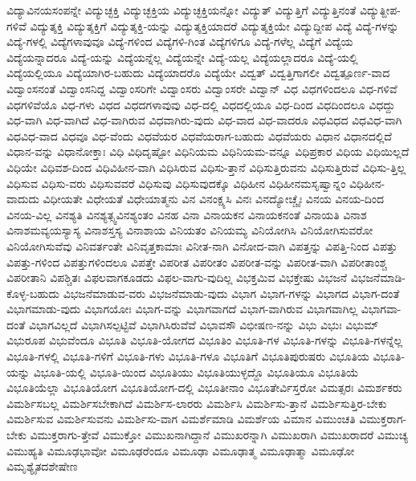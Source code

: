 {ವಿದ್ಯಾವಿನಯಸಂಪನ್ನೇ
ವಿದ್ಯುಚ್ಛಕ್ತಿ
ವಿದ್ಯುಚ್ಛಕ್ತಿಯ
ವಿದ್ಯುಚ್ಛಕ್ತಿಯನ್ನೋ
ವಿದ್ಯುತ್
ವಿದ್ಯುತ್ತಿಗೆ
ವಿದ್ಯುತ್ತಿನಂತೆ
ವಿದ್ಯುತ್ದೀಪ-ಗಳಿವೆ
ವಿದ್ಯುತ್ಶಕ್ತಿ
ವಿದ್ಯುತ್ಶಕ್ತಿಗೆ
ವಿದ್ಯುತ್ಶಕ್ತಿ-ಯನ್ನು
ವಿದ್ಯುತ್ಶಕ್ತಿಯಾದರೆ
ವಿದ್ಯುತ್ಶಕ್ತಿಯೇ
ವಿದ್ಯುದ್ದೀಪ
ವಿದ್ಯೆ
ವಿದ್ಯೆ-ಗಳನ್ನು
ವಿದ್ಯೆ-ಗಳಲ್ಲಿ
ವಿದ್ಯೆಗಳಾವುವೂ
ವಿದ್ಯೆ-ಗಳಿಂದ
ವಿದ್ಯೆಗಳಿ-ಗಿಂತ
ವಿದ್ಯೆಗಳಿಗೂ
ವಿದ್ಯೆ-ಗಳೆಲ್ಲ
ವಿದ್ಯೆಗೆ
ವಿದ್ಯೆಯ
ವಿದ್ಯೆಯನ್ನಾದರೂ
ವಿದ್ಯೆ-ಯನ್ನು
ವಿದ್ಯೆಯನ್ನೆಲ್ಲ
ವಿದ್ಯೆಯನ್ನೇ
ವಿದ್ಯೆ-ಯಲ್ಲ
ವಿದ್ಯೆಯಲ್ಲಾದರೂ
ವಿದ್ಯೆ-ಯಲ್ಲಿ
ವಿದ್ಯೆಯಲ್ಲಿಯೂ
ವಿದ್ಯೆಯಾಗಿರ-ಬಹುದು
ವಿದ್ಯೆಯಾದರೊ
ವಿದ್ಯೆಯೇ
ವಿದ್ವತ್
ವಿದ್ವತ್ತಿಗಾಗಲೀ
ವಿದ್ವತ್ಪೂರ್ಣ-ವಾದ
ವಿದ್ವಾಂಸನಂತೆ
ವಿದ್ವಾಂಸನಿದ್ದ
ವಿದ್ವಾಂಸರಿಗೇ
ವಿದ್ವಾಂಸರು
ವಿದ್ವಾಂಸರೇ
ವಿದ್ವಾನ್
ವಿಧ
ವಿಧಗಳಿಂದಲೂ
ವಿಧ-ಗಳಿವೆ
ವಿಧಗಳಿವೆಯೊ
ವಿಧ-ಗಳು
ವಿಧದ
ವಿಧದಗಳಾವುವು
ವಿಧ-ದಲ್ಲಿ
ವಿಧದಲ್ಲಿಯೂ
ವಿಧ-ದಿಂದ
ವಿಧದಿಂದಲೂ
ವಿಧದ್ದು
ವಿಧ-ವಾಗಿ
ವಿಧ-ವಾಗಿದೆ
ವಿಧ-ವಾಗಿರುವ
ವಿಧವಾಗಿರು-ವುದು
ವಿಧ-ವಾದ
ವಿಧ-ವಾದರೂ
ವಿಧವಿಧದ
ವಿಧವಿಧ-ವಾಗಿ
ವಿಧವಿಧ-ವಾದ
ವಿಧವೂ
ವಿಧ-ವೆಂದು
ವಿಧವೆಯರ
ವಿಧವೆಯರಾಗ-ಬಹುದು
ವಿಧವೆಯರು
ವಿಧಾನ
ವಿಧಾನದಲ್ಲಿದೆ
ವಿಧಾನ-ವನ್ನು
ವಿಧಾನೋಕ್ತಾಃ
ವಿಧಿ
ವಿಧಿದೃಷ್ಟೋ
ವಿಧಿನಿಯಮ
ವಿಧಿನಿಯಮ-ವನ್ನೂ
ವಿಧಿಪ್ರಕಾರ
ವಿಧಿಯ
ವಿಧಿಯಿಲ್ಲದೆ
ವಿಧಿಯೇ
ವಿಧಿವಶ-ದಿಂದ
ವಿಧಿವಿಹೀನ-ವಾಗಿ
ವಿಧಿಸಿರುವ
ವಿಧಿಸು-ತ್ತಾನೆ
ವಿಧಿಸುತ್ತಿರುವನು
ವಿಧಿಸುತ್ತಿರುವೆ
ವಿಧಿಸು-ತ್ತಿಲ್ಲ
ವಿಧಿಸುವ
ವಿಧಿಸು-ವರು
ವಿಧಿಸುವವರೆ
ವಿಧಿಸುವು
ವಿಧಿಸುವುದಕ್ಕೊ
ವಿಧಿಹೀನ
ವಿಧಿಹೀನಮಸೃಷ್ವಾನ್ನಂ
ವಿಧಿಹೀನ-ವಾದುದು
ವಿಧೀಯತೇ
ವಿಧೇಯತೆ
ವಿಧೇಯಾತ್ಮನು
ವಿನ
ವಿನಂಕ್ಷ್ಯಸಿ
ವಿನಃ
ವಿನದ್ಯೋಚ್ಚೈಃ
ವಿನಯ
ವಿನಯ-ದಿಂದ
ವಿನಯ-ವಿಲ್ಲ
ವಿನಶ್ಯತಿ
ವಿನಶ್ಯತ್ಸ್ವವಿನಶ್ಯಂತಂ
ವಿನಹ
ವಿನಾ
ವಿನಾಯಕನ
ವಿನಾಯಕನಂತೆ
ವಿನಾಯತಿ
ವಿನಾಶ
ವಿನಾಶಮವ್ಯಯಸ್ಯಾಸ್ಯ
ವಿನಾಶಸ್ತಸ್ಯ
ವಿನಾಶಾಯ
ವಿನಿಯತಂ
ವಿನಿಯಮ್ಯ
ವಿನಿಯೋಗಿಸಿ
ವಿನಿಯೋಗಿಸುವರೋ
ವಿನಿಯೋಗಿಸುವೆವು
ವಿನಿವರ್ತಂತೇ
ವಿನಿವೃತ್ತಕಾಮಾಃ
ವಿನೀತ-ನಾಗಿ
ವಿನೋದ-ವಾಗಿ
ವಿಪತ್ತನ್ನು
ವಿಪತ್ತಿ-ನಿಂದ
ವಿಪತ್ತು
ವಿಪತ್ತು-ಗಳಿಂದ
ವಿಪತ್ತುಗಳಿಂದಲೂ
ವಿಪತ್ತೇ
ವಿಪರೀತ
ವಿಪರೀತಂ
ವಿಪರೀತ-ವನ್ನು
ವಿಪರೀತ-ವಾಗಿ
ವಿಪರೀತಾಂಶ್ಚ
ವಿಪರೀತಾನಿ
ವಿಪಶ್ಚಿತಃ
ವಿಫಲವಾಗಕೂಡದು
ವಿಫಲ-ವಾಗು-ವುದಿಲ್ಲ
ವಿಭಕ್ತಮಿವ
ವಿಭಕ್ತೇಷು
ವಿಭಜನೆ
ವಿಭಜನೆಮಾಡಿ-ಕೊಳ್ಳ-ಬಹುದು
ವಿಭಜನೆಮಾಡುವ-ವರು
ವಿಭಜನೆಮಾಡು-ವುದು
ವಿಭಾಗ
ವಿಭಾಗ-ಗಳನ್ನು
ವಿಭಾಗದ
ವಿಭಾಗ-ದಂತೆ
ವಿಭಾಗಮಾಡು-ವುದು
ವಿಭಾಗಯೋಃ
ವಿಭಾಗ-ವನ್ನು
ವಿಭಾಗವಾಗದೆ
ವಿಭಾಗ-ವಾಗಿರುವ
ವಿಭಾಗವಾಗಿಲ್ಲ
ವಿಭಾಗವಾ-ದಂತೆ
ವಿಭಾಗವಿಲ್ಲದೆ
ವಿಭಾಗಿಸಲ್ಪಟ್ಟಿವೆ
ವಿಭಾಗಿಸಿರುವೆವೆ
ವಿಭಾವಸೌ
ವಿಭೀಷಣ-ನನ್ನು
ವಿಭು
ವಿಭುಃ
ವಿಭುಮ್
ವಿಭುರೂಪ
ವಿಭುವೆಂದೂ
ವಿಭೂತಿ
ವಿಭೂತಿ-ಯೋಗದ
ವಿಭೂತಿಂ
ವಿಭೂತಿ-ಗಳ
ವಿಭೂತಿ-ಗಳನ್ನು
ವಿಭೂತಿ-ಗಳನ್ನೆಲ್ಲ
ವಿಭೂತಿ-ಗಳಲ್ಲಿ
ವಿಭೂತಿ-ಗಳಿಗೆ
ವಿಭೂತಿ-ಗಳು
ವಿಭೂತಿ-ಗಳೂ
ವಿಭೂತಿಗೆ
ವಿಭೂತಿಪುರುಷರು
ವಿಭೂತಿಯ
ವಿಭೂತಿ-ಯನ್ನು
ವಿಭೂತಿ-ಯಲ್ಲಿ
ವಿಭೂತಿ-ಯಿಂದ
ವಿಭೂತಿಯು
ವಿಭೂತಿಯುಳ್ಳದ್ದೊ
ವಿಭೂತಿಯೂ
ವಿಭೂತಿಯೆ
ವಿಭೂತಿಯೆಲ್ಲಾ
ವಿಭೂತಿಯೋಗ
ವಿಭೂತಿಯೋಗ-ದಲ್ಲಿ
ವಿಭೂತೀನಾಂ
ವಿಭೂತೇರ್ವಿಸ್ತರೋ
ವಿಮತ್ಸರಃ
ವಿಮರ್ಶಕರು
ವಿಮರ್ಶಿಸಬಲ್ಲ
ವಿಮರ್ಶಿಸಬೇಕಾಗಿದೆ
ವಿಮರ್ಶಿಸ-ಲಾರರು
ವಿಮರ್ಶಿಸಿ
ವಿಮರ್ಶಿಸು-ತ್ತಾನೆ
ವಿಮರ್ಶಿಸುತ್ತಿರ-ಬೇಕು
ವಿಮರ್ಶಿಸುವ
ವಿಮರ್ಶಿಸುವನು
ವಿಮರ್ಶಿಸು-ವಾಗ
ವಿಮರ್ಶೆಮಾಡಿ
ವಿಮರ್ಶೆಯ
ವಿಮಾನ
ವಿಮುಂಚತಿ
ವಿಮುಕ್ತರಾಗ-ಬೇಕು
ವಿಮುಕ್ತರಾಗು-ತ್ತೇವೆ
ವಿಮುಕ್ತೋ
ವಿಮುಖನಾಗಿದ್ದಾನೆ
ವಿಮುಖರನ್ನಾಗಿ
ವಿಮುಖರಾಗಿ
ವಿಮುಖರಾದರೆ
ವಿಮುಚ್ಯ
ವಿಮುಹ್ಯತಿ
ವಿಮೂಢಭಾವೋ
ವಿಮೂಢರೆಂದೂ
ವಿಮೂಢಾ
ವಿಮೂಢಾತ್ಮ
ವಿಮೂಢಾತ್ಮಾ
ವಿಮೂಢೋ
ವಿಮೃಶ್ಯೈತದಶೇಷೇಣ
}
